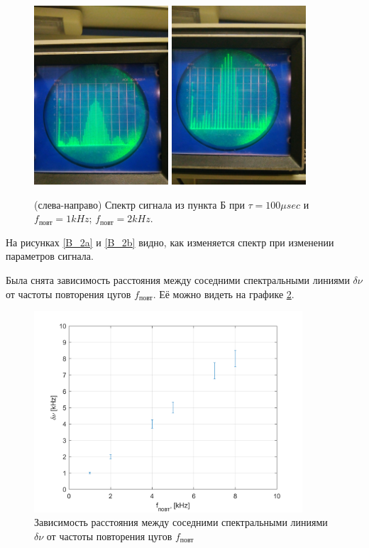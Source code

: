 \documentclass[a4paper,12pt]{article}
\begin{document}
\begin{figure}[tpb]
\centering
\includegraphics[width=50mm]{Pictures/B4-1.jpg}
\includegraphics[width=50mm]{Pictures/B4-2.jpg}
\caption{(слева-направо) Спектр сигнала из пункта Б при $\tau = 100\mu sec$ и $f_\text{повт} = 1 kHz$; $f_\text{повт} = 2 kHz$.}
\label{B_4}
\end{figure}

На рисунках \ref{B_2a} и \ref{B_2b} видно, как изменяется спектр при изменении параметров сигнала.

Была снята зависимость расстояния между соседними спектральными линиями $\delta \nu$ от частоты повторения цугов $f_\text{повт}$. Её можно видеть на графике \ref{B_5}.

\begin{figure}[tpb]
\centering
\includegraphics[width=100mm]{PlotB.png}
\caption{Зависимость расстояния между соседними спектральными линиями $\delta \nu$ от частоты повторения цугов $f_\text{повт}$}
\label{B_5}
\end{figure}
\end{document}
